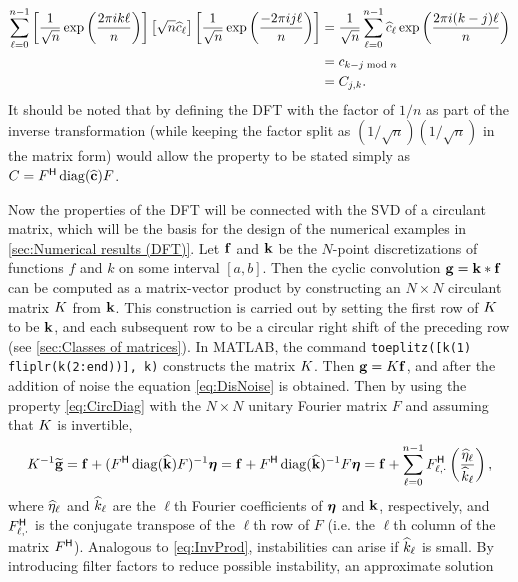 \begin{align*}
\sum_{\ell=0}^{n-1} \left[\frac{1}{\sqrt{n}}  \exp\left(\frac{2\pi{i}k\ell}{n}\right)\right] \left[\sqrt{n}\widehat{c}_\ell\right] \left[\frac{1}{\sqrt{n}} \exp\left(\frac{-2\pi{i}j\ell}{n}\right)\right] &= \frac{1}{\sqrt{n}} \sum_{\ell=0}^{n-1} \widehat{c}_\ell \exp\left(\frac{2\pi{i}(k-j)\ell}{n}\right) \\
&= c_{k-j \bmod n} \\
&= C_{j,k}.
\end{align*}
It should be noted that by defining the DFT with the factor of $1/n$ as part of the inverse transformation (while keeping the factor split as $(1/\sqrt{n})(1/\sqrt{n})$ in the matrix form) would allow the property to be stated simply as $C = {F}^\mathsf{H}\operatorname{diag}(\widehat{\mathbf{c}})F$. \par 
Now the properties of the DFT will be connected with the SVD of a circulant matrix, which will be the basis for the design of the numerical examples in \ref{sec:Numerical results (DFT)}. Let $\mathbf{f}$ and $\mathbf{k}$ be the $N$-point discretizations of functions $f$ and $k$ on some interval $[a,b]$. Then the cyclic convolution $\mathbf{g} = \mathbf{k} * \mathbf{f}$ can be computed as a matrix-vector product by constructing an $N \times N$ circulant matrix $K$ from $\mathbf{k}$. This construction is carried out by setting the first row of $K$ to be $\mathbf{k}$, and each subsequent row to be a circular right shift of the preceding row (see \ref{sec:Classes of matrices}). In MATLAB, the command \texttt{toeplitz([k(1) fliplr(k(2:end))], k)} constructs the matrix $K$. Then $\mathbf{g} = K\mathbf{f}$, and after the addition of noise the equation \eqref{eq:DisNoise} is obtained. Then by using the property \eqref{eq:CircDiag} with the $N \times N$ unitary Fourier matrix $F$ and assuming that $K$ is invertible, 
\begin{equation}
K^{-1}\widetilde{\mathbf{g}} = \mathbf{f} + ({F}^\mathsf{H}\operatorname{diag}(\widehat{\mathbf{k}})F)^{-1}\boldsymbol{\eta} = \mathbf{f} + {F}^\mathsf{H}\operatorname{diag}(\widehat{\mathbf{k}})^{-1}F\boldsymbol{\eta} = \mathbf{f} + \sum_{\ell = 0}^{n-1} {F}^\mathsf{H}_{\ell,\cdot}\left(\frac{\widehat{\eta}_\ell}{\widehat{k}_\ell}\right),
\label{eq:InvProdDFT}
\end{equation}
where $\widehat{\eta}_\ell$ and $\widehat{k}_\ell$ are the $\ell$th Fourier coefficients of $\boldsymbol{\eta}$ and $\mathbf{k}$, respectively, and ${F}^\mathsf{H}_{\ell,\cdot}$ is the conjugate transpose of the $\ell$th row of $F$ (i.e. the $\ell$th column of the matrix ${F}^\mathsf{H}$). Analogous to \eqref{eq:InvProd}, instabilities can arise if $\widehat{k}_\ell$ is small. By introducing filter factors to reduce possible instability, an approximate solution
